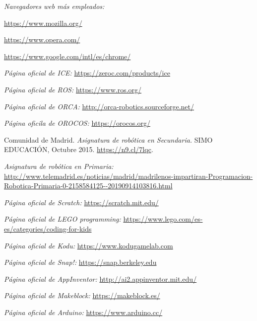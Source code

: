 \begin{thebibliography}{99}

    \textit{Navegadores web más empleados:}

    \url{https://www.mozilla.org/}
    
    \url{https://www.opera.com/}
    
    \url{https://www.google.com/intl/es/chrome/}
    
    \textit{Página oficial de ICE:}
    \url{https://zeroc.com/products/ice}
    
    \textit{Página oficial de ROS:}
    \url{https://www.ros.org/}
    
    \textit{Página oficial de ORCA:}
    \url{http://orca-robotics.sourceforge.net/}
    
    \textit{Página oficila de OROCOS:}
    \url{https://orocos.org/}
    
    Comunidad de Madrid. %
    \textit{Asignatura de robótica en Secundaria.} %
    SIMO EDUCACIÓN, Octubre 2015. %
    \url{https://n9.cl/7lqc}. %

    \textit{Asignatura de robótica en Primaria:}
    \url{http://www.telemadrid.es/noticias/madrid/madrilenos-impartiran-Programacion-Robotica-Primaria-0-2158584125--20190914103816.html}

    \textit{Página oficial de Scratch:}
    \url{https://scratch.mit.edu/}
    
    \textit{Página oficial de LEGO programming:}
    \url{https://www.lego.com/es-es/categories/coding-for-kids}
    
    \textit{Página oficial de Kodu:}
    \url{https://www.kodugamelab.com}
    
    \textit{Página oficial de Snap!:}
    \url{https://snap.berkeley.edu}
    
    \textit{Página oficial de AppInventor:}
    \url{http://ai2.appinventor.mit.edu/}
    
    \textit{Página oficial de Makeblock:}
    \url{https://makeblock.es/}
    
    \textit{Página oficial de Arduino:}
    \url{https://www.arduino.cc/}
    

\end{thebibliography}
